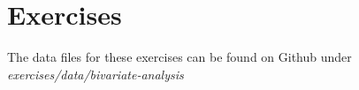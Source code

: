 %
%
%
%

\section{Exercises}
\label{sec:bivariate-analysis-exercises}

The data files for these exercises can be found on Github under \emph{exercises/data/bivariate-analysis}

